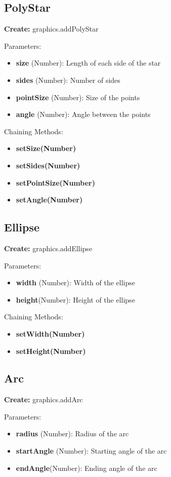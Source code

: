 \documentclass{article}
\begin{document}
\subsection{PolyStar}
\textbf{Create:} graphics.addPolyStar

Parameters:
\begin{itemize}
\item \textbf{size} (Number): Length of each side of the star
\item \textbf{sides} (Number): Number of sides
\item \textbf{pointSize} (Number): Size of the points
\item \textbf{angle} (Number): Angle between the points
\end{itemize}

Chaining Methods:
\begin{itemize}
\item \textbf{setSize(Number)} 
\item \textbf{setSides(Number)} 
\item \textbf{setPointSize(Number)} 
\item \textbf{setAngle(Number)}
\end{itemize}

\subsection{Ellipse}
\textbf{Create:} graphics.addEllipse

Parameters:
\begin{itemize}
\item \textbf{width} (Number): Width of the ellipse
\item \textbf{height}(Number): Height of the ellipse
\end{itemize}

Chaining Methods:
\begin{itemize}
\item \textbf{setWidth(Number)} 
\item \textbf{setHeight(Number)}
\end{itemize}

\subsection{Arc}
\textbf{Create:} graphics.addArc

Parameters:
\begin{itemize}
\item \textbf{radius} (Number): Radius of the arc
\item \textbf{startAngle} (Number): Starting angle of the arc
\item \textbf{endAngle}(Number): Ending angle of the arc
\end{itemize}
\end{document}
